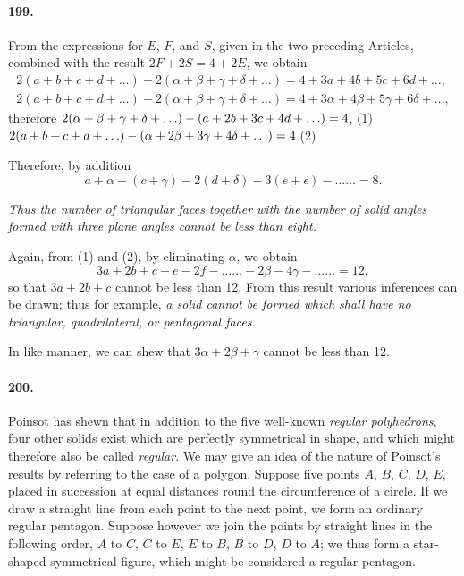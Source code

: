 \documentclass{book}[2004/02/16]
\begin{document}
\begin{mainmatter}
\begin{spacing}{1.3}
\paragraph{199.} From the expressions for $E$, $F$, and $S$, given in the
two preceding Articles, combined with the result $2F + 2S=4 + 2E$,
we obtain
\begin{gather*}
  2 (a + b + c + d + \ldots)
+ 2 (\alpha + \beta + \gamma + \delta + \ldots)
= 4 + 3a + 4b + 5c + 6d + \ldots,
\\
  2 (a + b + c + d + \ldots)
+ 2 (\alpha + \beta + \gamma + \delta + \ldots)
= 4 + 3 \alpha + 4 \beta + 5 \gamma + 6 \delta + \ldots,
\end{gather*}
therefore $\hfill
  2 (\alpha + \beta + \gamma + \delta + \ldots)
- (a + 2b + 3c + 4d + \ldots)
= 4$, \hfill(1)
\\
\phantom{therefore} $\hfill
  2 (a + b + c + d + \ldots)
- (\alpha + 2 \beta + 3 \gamma + 4 \delta + \ldots)
= 4$.\hfill(2)

Therefore, by addition
\[
a + \alpha - (c + \gamma) - 2 (d + \delta) - 3 (e + \epsilon) - \ldots\ldots = 8.
\]

\textit{Thus the number of triangular faces together with the number
of solid angles formed with three plane angles cannot be less
than eight.}

Again, from (1) and (2), by eliminating $\alpha$, we obtain
\[
3a + 2b + c - e - 2f - \ldots\ldots -2\beta - 4\gamma - \ldots\ldots = 12,
\]
so that $3a + 2b + c$ cannot be less than 12. From this result
various inferences can be drawn; thus for example, \textit{a solid cannot
be formed which shall have no triangular, quadrilateral, or pentagonal
faces.}

In like manner, we can shew that $3 \alpha + 2 \beta + \gamma$ cannot be less
than 12.

\paragraph{200.} Poinsot has shewn that in addition to the five well-known
\textit{regular polyhedrons}, four other solids exist which are
perfectly symmetrical in shape, and which might therefore also be
called \textit{regular}. We may give an idea of the nature of Poinsot's
results by referring to the case of a polygon. Suppose five points
$A$, $B$, $C$, $D$, $E$, placed in succession at equal distances round the
circumference of a circle. If we draw a straight line from each
point to the next point, we form an ordinary regular pentagon.
Suppose however we join the points by straight lines in the following
order, $A$ to $C$, $C$ to $E$, $E$ to $B$, $B$ to $D$, $D$ to $A$; we thus
form a star-shaped symmetrical figure, which might be considered
a regular pentagon.


\end{spacing}
\end{mainmatter}
\end{document}
